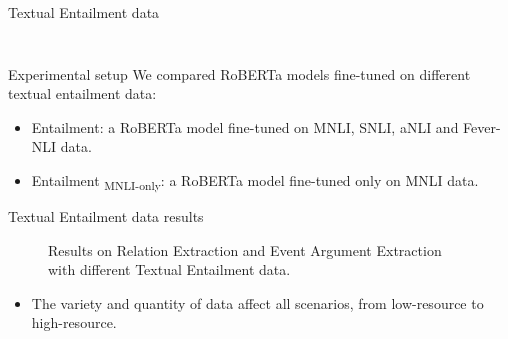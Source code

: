 \documentclass[
    11pt,
    notheorems,
    xcolor={dvipsnames},
    hyperref={
        pdfstartview=FitH, 
        pdftitle={Ikasketa-adibide urriko Informazio-Erauzketa}, 
        pdfauthor={Oscar Sainz Jimenez}, 
        citecolor=secondary, 
    }
]{beamer}
\begin{document}
\begin{frame}
\begin{block}{Textual Entailment data}
\begin{columns}
\begin{column}{.40\textwidth}
\begin{figure}

                \end{figure}
            \end{column}
        \end{columns}

    \end{block}
\end{frame}

\begin{frame}
    \begin{block}{Experimental setup}
        We compared RoBERTa models fine-tuned on different textual entailment data:
        \begin{itemize}
            \item Entailment: a RoBERTa model fine-tuned on MNLI, SNLI, aNLI and Fever-NLI data.
            \item Entailment\textsubscript{ MNLI-only}: a RoBERTa model fine-tuned only on MNLI data.
        \end{itemize}

    \end{block}
\end{frame}

\begin{frame}
    \begin{block}{Textual Entailment data results}
        \begin{figure}
            \centering
            \resizebox{.95\textwidth}{!}{
                
            }
            \caption{Results on Relation Extraction and Event Argument Extraction with different Textual Entailment data.}
        \end{figure}

        \begin{itemize}
            \item The variety and quantity of data affect all scenarios, from low-resource to high-resource.
        \end{itemize}
    \end{block}

\end{frame}
\end{document}
